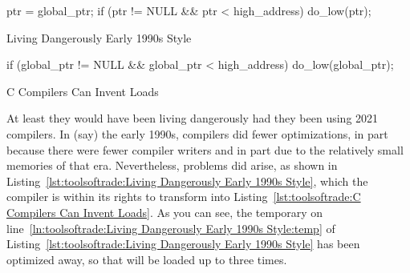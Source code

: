 \begin{listing}[tbp]
\begin{fcvlabel}
\begin{VerbatimL}[commandchars=\\\{\}]
ptr = global_ptr;
if (ptr != NULL && ptr < high_address)
	do_low(ptr);
\end{VerbatimL}
\end{fcvlabel}
\caption{Living Dangerously Early 1990s Style}
\label{lst:toolsoftrade:Living Dangerously Early 1990s Style}
\end{listing}

\begin{listing}[tbp]
\begin{fcvlabel}
\begin{VerbatimL}[commandchars=\\\{\}]
if (global_ptr != NULL &&
    global_ptr < high_address)
	do_low(global_ptr);
\end{VerbatimL}
\end{fcvlabel}
\caption{C Compilers Can Invent Loads}
\label{lst:toolsoftrade:C Compilers Can Invent Loads}
\end{listing}

At least they would have been living dangerously had they been using
2021 compilers.
In (say) the early 1990s, compilers did fewer optimizations, in part
because there were fewer compiler writers and in part due to the
relatively small memories of that era.
Nevertheless, problems did arise, as shown in
Listing~\ref{lst:toolsoftrade:Living Dangerously Early 1990s Style},
which the compiler is within its rights to transform into
Listing~\ref{lst:toolsoftrade:C Compilers Can Invent Loads}.
As you can see, the temporary on
line~\ref{ln:toolsoftrade:Living Dangerously Early 1990s Style:temp} of
Listing~\ref{lst:toolsoftrade:Living Dangerously Early 1990s Style}
has been optimized away, so that  will be loaded
up to three times.

